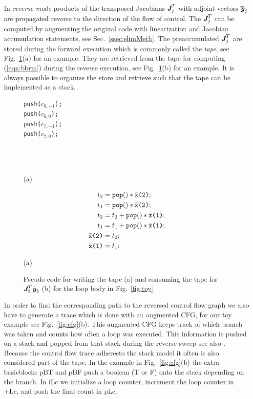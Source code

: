 \documentclass[11pt]{article}
\newcommand{\basicblock}{basicblock}
\newcommand{\bmJ}{\mbox{\bf\em J}}
\newcommand{\bmy}{\mbox{\bf\em y}}
\newcommand{\code}[1]{{\small\tt{#1}}}
\newcommand{\refsec}[1]{{Sec.~\ref{#1}}}
\newcommand{\reffig}[1]{{Fig.~\ref{#1}}}
\newcommand{\refeqn}[1]{{(\ref{#1})}}
\begin{document}
In {\em reverse mode} products of the transposed
Jacobians $\bmJ^T_j$ with adjoint vectors $\overline{\bmy}_j$
are propagated reverse to the direction of the flow of control.
The $\bmJ^T_j$ can be computed by augmenting the original code with 
linearization and Jacobian accumulation statements, see \refsec{ssec:elimMeth}.
The preaccumulated  $\bmJ^T_j$ are stored during the forward execution
which is commonly called the {\em tape}, see \reffig{fig:toyPreaccRev}(a) for an 
example. They are retrieved from the 
tape for computing \refeqn{eqn:bbrm} during the reverse execution, see \reffig{fig:toyPreaccRev}(b) for 
an example. 
It is always possible to organize the store and retrieve such that the tape can be 
implemented as a stack.
\begin{figure}[h]
  \begin{center}
    \begin{minipage}[b]{.2\linewidth}
      \code{push(}$c_{6,-1}$\code{);}\\
      \code{push(}$c_{6,0}$\code{);}\\
      \code{push(}$c_{7,-1}$\code{);}\\
      \code{push(}$c_{7,0}$\code{);}\\
      \\ \\ \\
      \centerline{(a)}
    \end{minipage}
    \begin{minipage}[b]{.2\linewidth}
      \small
      \begin{align*}
        t_2&=\code{pop()}*\bar{\tt x}\mbox{\tt (2)};\\
        t_1&=\code{pop()}*\bar{\tt x}\mbox{\tt (2)};\\
        t_2&=t_2+\code{pop()}*\bar{\tt x}\mbox{\tt (1)};\\
        t_1&=t_1+\code{pop()}*\bar{\tt x}\mbox{\tt (1)};\\
        \bar{\tt x}\mbox{\tt (2)}& =t_2;\\
        \bar{\tt x}\mbox{\tt (1)}& =t_1;
      \end{align*}
      \centerline{(a)}
    \end{minipage}
  \end{center}	
  \caption{Pseudo code for writing the tape (a) and consuming the tape for  $\bmJ_3^T\bar{\bmy}_3$ (b) for  the loop body in \reffig{fig:toy}}\label{fig:toyPreaccRev}
\end{figure}

In order to find the corresponding path to the reversed control flow graph 
we also have to generate a trace which is done with an augmented CFG,
for our toy example see \reffig{fig:cfg}(b).
This augmented CFG  keeps track of which branch was taken and counts how 
often a loop was 
executed.  
This information is pushed on  a stack and popped from that stack during the 
reverse sweep see also \cite{scam2004}. Because the control flow trace 
adheresto the stack model it often is also considered part of the tape. 
In the example in \reffig{fig:cfg}(b) the extra {\basicblock}s pBT and pBF push 
a boolean (T or F) onto the stack depending on the branch. 
In iLc we initialize a loop counter, increment the loop counter in +Lc, 
and push the final count in pLc. 
\end{document}

